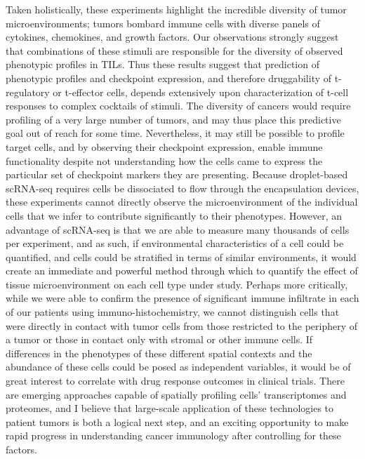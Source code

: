 Taken holistically, these experiments highlight the incredible diversity of tumor microenvironments; tumors bombard immune cells with diverse panels of cytokines, chemokines, and growth factors. 
Our observations strongly suggest that combinations of these stimuli are responsible for the diversity of observed phenotypic profiles in TILs. 
Thus these results suggest that prediction of phenotypic profiles and checkpoint expression, and therefore druggability of t-regulatory or t-effector cells, depends extensively upon characterization of t-cell responses to complex cocktails of stimuli. 
The diversity of cancers would require profiling of a very large number of tumors, and may thus place this predictive goal out of reach for some time. 
Nevertheless, it may still be possible to profile target cells, and by observing their checkpoint expression, enable immune functionality despite not understanding how the cells came to express the particular set of checkpoint markers they are presenting.
Because droplet-based scRNA-seq requires cells be dissociated to flow through the encapsulation devices, these experiments cannot directly observe the microenvironment of the individual cells that we infer to contribute significantly to their phenotypes. 
However, an advantage of scRNA-seq is that we are able to measure many thousands of cells per experiment, and as such, if environmental characteristics of a cell could be quantified, and cells could be stratified in terms of similar environments, it would create an immediate and powerful method through which to quantify the effect of tissue microenvironment on each cell type under study. 
Perhaps more critically, while we were able to confirm the presence of significant immune infiltrate in each of our patients using immuno-histochemistry, we cannot distinguish cells that were directly in contact with tumor cells from those restricted to the periphery of a tumor or those in contact only with stromal or other immune cells. 
If differences in the phenotypes of these different spatial contexts and the abundance of these cells could be posed as independent variables, it would be of great interest to correlate with drug response outcomes in clinical trials.  
There are emerging approaches capable of spatially profiling cells' transcriptomes and proteomes, and I believe that large-scale application of these technologies to patient tumors is both a logical next step, and an exciting opportunity to make rapid progress in understanding cancer immunology after controlling for these factors. 

